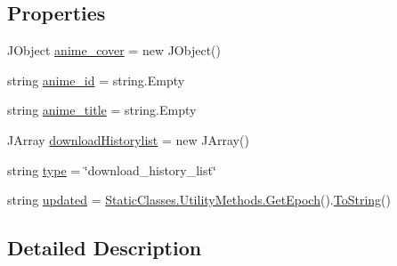 \subsection*{Properties}
\begin{DoxyCompactItemize}
\item 
J\+Object \mbox{\hyperlink{class_little_weeb_library_1_1_models_1_1_json_downloaded_list_ae9c0af7921d00044b0d8f3979a568674}{anime\+\_\+cover}} = new J\+Object()
\item 
string \mbox{\hyperlink{class_little_weeb_library_1_1_models_1_1_json_downloaded_list_a11d6f5b4211280127583ee5311386f15}{anime\+\_\+id}} = string.\+Empty
\item 
string \mbox{\hyperlink{class_little_weeb_library_1_1_models_1_1_json_downloaded_list_acee14c943bef27ef60807f308c375d41}{anime\+\_\+title}} = string.\+Empty
\item 
J\+Array \mbox{\hyperlink{class_little_weeb_library_1_1_models_1_1_json_downloaded_list_a703b2878786376f7a1ad264118a70d75}{download\+Historylist}} = new J\+Array()
\item 
string \mbox{\hyperlink{class_little_weeb_library_1_1_models_1_1_json_downloaded_list_a0a9823bb8700fb7c7c095112f0198ec1}{type}} = \char`\"{}download\+\_\+history\+\_\+list\char`\"{}
\item 
string \mbox{\hyperlink{class_little_weeb_library_1_1_models_1_1_json_downloaded_list_a3b07c23e2d9771cd069857ff761d20e2}{updated}} = \mbox{\hyperlink{class_little_weeb_library_1_1_static_classes_1_1_utility_methods_a12336d9e64983ddabaad8950486fafb2}{Static\+Classes.\+Utility\+Methods.\+Get\+Epoch}}().\mbox{\hyperlink{class_little_weeb_library_1_1_models_1_1_json_downloaded_list_a85d819ca67ad513254f77d395eef4816}{To\+String}}()
\end{DoxyCompactItemize}


\subsection{Detailed Description}


